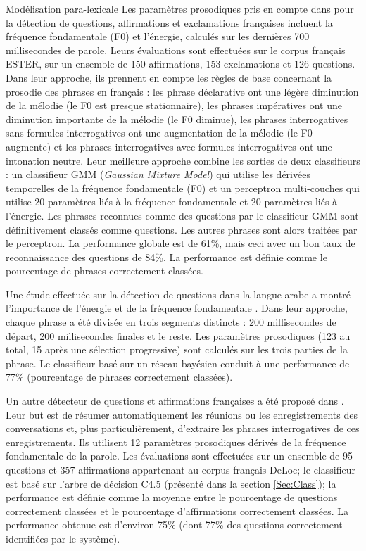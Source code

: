 \documentclass{style/these}
\let\oldcite=\cite
\renewcommand{\cite}[1]{{\fontfamily{qcs}\selectfont{\color{darkerblue}[\oldcite{#1}]}}}
\begin{document}
\begin{part}{Modélisation para-lexicale}
Les paramètres prosodiques pris en compte dans \cite{Kral:2005} pour la détection de questions, affirmations et exclamations françaises  incluent la fréquence fondamentale (F0) et l'énergie, calculés sur les dernières 700 millisecondes de parole.  
Leurs évaluations sont effectuées sur le corpus français ESTER, sur un ensemble de 150 affirmations, 153 exclamations et 126 questions. 
Dans leur approche, ils prennent en compte les règles de base concernant la prosodie des phrases en français : les phrase déclarative ont une  légère diminution de la mélodie (le F0 est presque stationnaire), les phrases impératives ont une diminution importante de la mélodie (le F0 diminue), les phrases interrogatives sans formules interrogatives ont une augmentation de la mélodie (le F0 augmente) et les phrases interrogatives avec formules interrogatives ont une intonation neutre. 
Leur meilleure approche combine les sorties de deux classifieurs : un classifieur \acrshort{GMM} (\textit{Gaussian Mixture Model}) qui utilise les dérivées temporelles de la fréquence fondamentale (F0) et un perceptron multi-couches qui utilise 20 paramètres liés à la fréquence fondamentale et 20 paramètres liés à l'énergie. 
Les phrases reconnues comme des questions par le classifieur \acrshort{GMM} sont définitivement classés comme questions. 
Les autres phrases sont alors traitées par le perceptron. 
La performance globale est de 61\%, mais ceci avec un bon taux de reconnaissance des questions de 84\%. 
La performance est définie comme le pourcentage de phrases correctement classées. 

Une étude effectuée sur la détection de questions dans la langue arabe a montré l'importance de l'énergie et de la fréquence fondamentale \cite{Khan:2010}. 
Dans leur approche, chaque phrase a été divisée en trois segments distincts : 200 millisecondes de départ, 200 millisecondes finales et le reste. 
Les paramètres prosodiques (123 au total, 15 après une sélection progressive) sont calculés sur les trois parties de la phrase.
Le classifieur basé sur un réseau bayésien conduit à une performance de 77\% (pourcentage de phrases correctement classées).

Un autre détecteur de questions et affirmations françaises a été proposé dans \cite{Quang:2006}. 
Leur but est de résumer automatiquement les réunions ou les enregistrements des conversations et, plus particulièrement, d'extraire les phrases interrogatives de ces enregistrements. 
Ils utilisent 12 paramètres prosodiques dérivés de la fréquence fondamentale de la parole.
Les évaluations sont effectuées sur un ensemble de 95 questions et 357 affirmations appartenant au corpus français DeLoc; 
le classifieur est basé sur l'arbre de décision C4.5 (présenté dans la section \ref{Sec:Class}); 
la performance est définie comme la moyenne entre le pourcentage de questions correctement classées et le pourcentage d'affirmations correctement classées.
La performance obtenue est d'environ 75\% (dont 77\% des questions correctement identifiées par le système). 



\end{part}
\end{document}
